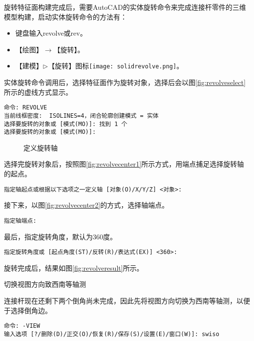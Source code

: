 \begin{procedure}
旋转特征面构建完成后，需要AutoCAD的实体旋转命令来完成连接杆零件的三维模型构建，启动实体旋转命令的方法有：
\begin{itemize}
\item 键盘输入revolve或rev。
\item 【绘图】$\rightarrow$【旋转】。
\item 【建模】$\triangleright$【旋转】图标\texttt{[image: solidrevolve.png]}。
\end{itemize}

实体旋转命令调用后，选择特征面作为旋转对象，选择后会以图\ref{fig:revolveselect}所示的虚线方式显示。
\begin{lstlisting}
命令: REVOLVE
当前线框密度:  ISOLINES=4，闭合轮廓创建模式 = 实体
选择要旋转的对象或 [模式(MO)]: 找到 1 个
选择要旋转的对象或 [模式(MO)]:
\end{lstlisting}

\begin{figure}[htbp]
\centering
{}\hspace{20pt}
\caption{定义旋转轴}
\end{figure}

选择完旋转对象后，按照图\ref{fig:revolvecenter1}所示方式，用端点捕足选择旋转轴的起点。
\begin{lstlisting}
指定轴起点或根据以下选项之一定义轴 [对象(O)/X/Y/Z] <对象>:
\end{lstlisting}

接下来，以图\ref{fig:revolvecenter2}的方式，选择轴端点。
\begin{lstlisting}
指定轴端点:
\end{lstlisting}

最后，指定旋转角度，默认为360度。
\begin{lstlisting}
指定旋转角度或 [起点角度(ST)/反转(R)/表达式(EX)] <360>:
\end{lstlisting}

旋转完成后，结果如图\ref{fig:revolveresult}所示。
\item 切换视图方向致西南等轴测

连接杆现在还剩下两个倒角尚未完成，因此先将视图方向切换为西南等轴测，以便于选择倒角边。
\begin{lstlisting}
命令: -VIEW
输入选项 [?/删除(D)/正交(O)/恢复(R)/保存(S)/设置(E)/窗口(W)]: swiso 
\end{lstlisting}


\end{procedure}
